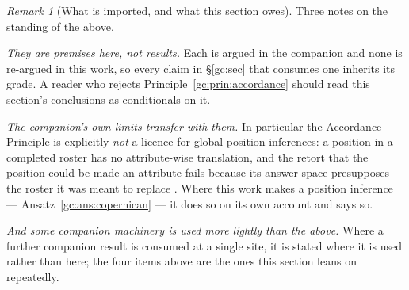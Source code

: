 \documentclass[11pt]{article}
\numberwithin{equation}{section}
\theoremstyle{plain}
\theoremstyle{definition}
\theoremstyle{remark}
\newtheorem{remark}[theorem]{Remark}
\begin{document}
\begin{remark}[What is imported, and what this section owes]
\label{gc:rem:importscope}
Three notes on the standing of the above.

\emph{They are premises here, not results.} Each is argued in the
companion and none is re-argued in this work, so every claim in
\S\ref{gc:sec} that consumes one inherits its grade. A reader who
rejects Principle~\ref{gc:prin:accordance} should read this section's
conclusions as conditionals on it.

\emph{The companion's own limits transfer with them.} In particular the
Accordance Principle is explicitly \emph{not} a licence for global
position inferences: a position in a completed roster has no
attribute-wise translation, and the retort that the position could be
made an attribute fails because its answer space presupposes the roster
it was meant to replace \cite{NexicFoundation}. Where this work makes a
position inference --- Ansatz~\ref{gc:ans:copernican} --- it does so on
its own account and says so.

\emph{And some companion machinery is used more lightly than the above.}
Where a further companion result is consumed at a single site, it is
stated where it is used rather than here; the four items above are the
ones this section leans on repeatedly.
\end{remark}
\end{document}
